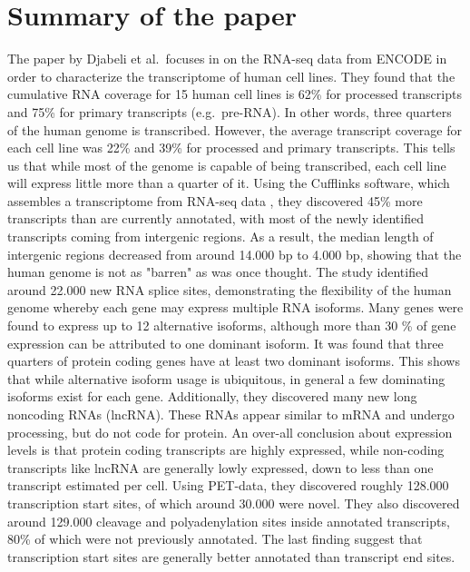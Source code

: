 \section{Summary of the paper}
The paper by Djabeli et al.\ focuses in on the RNA-seq data from ENCODE in
order to characterize the transcriptome of human cell lines. They found that
the cumulative RNA coverage for 15 human cell lines is 62\% for processed
transcripts and 75\% for primary transcripts (e.g.\ pre-RNA). In other words,
three quarters of the human genome is transcribed. However, the average
transcript coverage for each cell line was 22\% and 39\% for processed and
primary transcripts. This tells us that while most of the genome is capable of
being transcribed, each cell line will express little more than a quarter of
it. Using the Cufflinks software, which assembles a transcriptome from RNA-seq
data \cite{trapnell_transcript_2010}, they discovered 45\% more transcripts
than are currently annotated, with most of the newly identified transcripts
coming from intergenic regions. As a result, the median length of intergenic
regions decreased from around 14.000 bp to 4.000 bp, showing that the human
genome is not as "barren" as was once thought. The study identified around
22.000 new RNA splice sites, demonstrating the flexibility of the human genome
whereby each gene may express multiple RNA isoforms. Many genes were found to
express up to 12 alternative isoforms, although more than 30 \% of gene
expression can be attributed to one dominant isoform. It was found that three
quarters of protein coding genes have at least two dominant isoforms. This
shows that while alternative isoform usage is ubiquitous, in general a few
dominating isoforms exist for each gene. Additionally, they discovered many new
long noncoding RNAs (lncRNA). These RNAs appear similar to mRNA and undergo
processing, but do not code for protein. An over-all conclusion about
expression levels is that protein coding transcripts are highly expressed,
while non-coding transcripts like lncRNA are generally lowly expressed, down to
less than one transcript estimated per cell. Using PET-data, they discovered
roughly 128.000 transcription start sites, of which around 30.000 were novel.
They also discovered around 129.000 cleavage and polyadenylation sites inside
annotated transcripts, 80\% of which were not previously annotated. The last
finding suggest that transcription start sites are generally better annotated
than transcript end sites.

